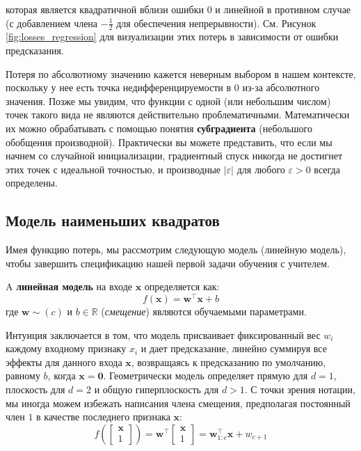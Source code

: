 которая является квадратичной вблизи ошибки $0$ и линейной в противном случае (с добавлением члена $-\frac{1}{2}$ для обеспечения непрерывности). См. Рисунок \ref{fig:losses_regression} для визуализации этих потерь в зависимости от ошибки предсказания. 

Потеря по абсолютному значению кажется неверным выбором в нашем контексте, поскольку у нее есть точка недифференцируемости в $0$ из-за абсолютного значения. Позже мы увидим, что функции с одной (или небольшим числом) точек такого вида не являются действительно проблематичными. Математически их можно обрабатывать с помощью понятия \textbf{субградиента} (небольшого обобщения производной). Практически вы можете представить, что если мы начнем со случайной инициализации, градиентный спуск никогда не достигнет этих точек с идеальной точностью, и производные $\lvert \varepsilon \rvert$ для любого $\varepsilon > 0$ всегда определены.

\subsection{Модель наименьших квадратов}
\label{subsec:least_squares}

\addclock Имея функцию потерь, мы рассмотрим следующую модель (линейную модель), чтобы завершить спецификацию нашей первой задачи обучения с учителем.
%
\begin{definition} 
A \textbf{линейная модель} на входе $\mathbf{x}$ определяется как:
%
$$
f(\mathbf{x})=\mathbf{w}^\top\mathbf{x} + b
$$
%
где $\mathbf{w} \sim (c)$ и $b \in \mathbb{R}$ (\textit{смещение}) являются обучаемыми параметрами.
\end{definition}

Интуиция заключается в том, что модель присваивает фиксированный вес $w_i$ каждому входному признаку $x_i$ и дает предсказание, линейно суммируя все эффекты для данного входа $\mathbf{x}$, возвращаясь к предсказанию по умолчанию, равному $b$, когда $\mathbf{x} = \mathbf{0}$. Геометрически модель определяет прямую для $d=1$, плоскость для $d=2$ и общую гиперплоскость для $d > 1$. С точки зрения нотации, мы иногда можем избежать написания члена смещения, предполагая постоянный член $1$ в качестве последнего признака $\mathbf{x}$:
%
$$
f\left(\begin{bmatrix}\mathbf{x}\\1\end{bmatrix}\right) = \mathbf{w}^\top\begin{bmatrix}\mathbf{x}\\1\end{bmatrix} = \mathbf{w}_{1:c}^\top\mathbf{x}+w_{c+1}
$$

